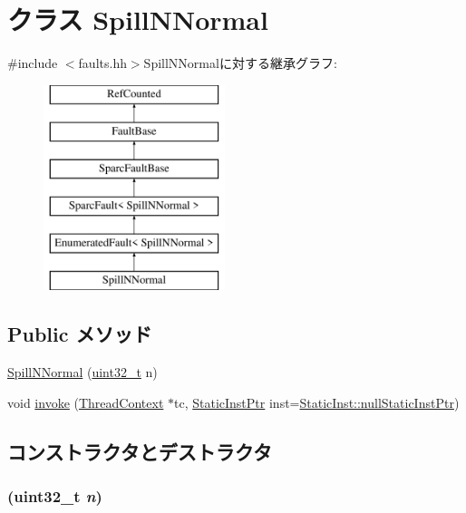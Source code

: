 \hypertarget{classSparcISA_1_1SpillNNormal}{
\section{クラス SpillNNormal}
\label{classSparcISA_1_1SpillNNormal}
}


{\ttfamily \#include $<$faults.hh$>$}SpillNNormalに対する継承グラフ:\begin{figure}[H]
\begin{center}
\leavevmode
\includegraphics[height=6cm]{classSparcISA_1_1SpillNNormal}
\end{center}
\end{figure}
\subsection*{Public メソッド}
\begin{DoxyCompactItemize}
\item 
\hyperlink{classSparcISA_1_1SpillNNormal_a98d9128fb8956b80880fdb74d18aa4f1}{SpillNNormal} (\hyperlink{Type_8hh_a435d1572bf3f880d55459d9805097f62}{uint32\_\-t} n)
\item 
void \hyperlink{classSparcISA_1_1SpillNNormal_a2bd783b42262278d41157d428e1f8d6f}{invoke} (\hyperlink{classThreadContext}{ThreadContext} $\ast$tc, \hyperlink{classRefCountingPtr}{StaticInstPtr} inst=\hyperlink{classStaticInst_aa793d9793af735f09096369fb17567b6}{StaticInst::nullStaticInstPtr})
\end{DoxyCompactItemize}


\subsection{コンストラクタとデストラクタ}
\hypertarget{classSparcISA_1_1SpillNNormal_a98d9128fb8956b80880fdb74d18aa4f1}{
\subsubsection[{SpillNNormal}]{ ({\bf uint32\_\-t} {\em n})}}
\label{classSparcISA_1_1SpillNNormal_a98d9128fb8956b80880fdb74d18aa4f1}



